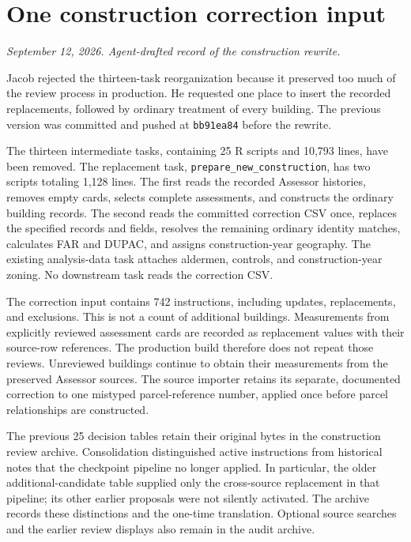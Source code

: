 \section*{One construction correction input}
\textit{September 12, 2026. Agent-drafted record of the construction rewrite.}

Jacob rejected the thirteen-task reorganization because it preserved too much
of the review process in production. He requested one place to insert the
recorded replacements, followed by ordinary treatment of every building. The
previous version was committed and pushed at \texttt{bb91ea84} before the rewrite.

The thirteen intermediate tasks, containing 25 R scripts and 10,793 lines, have
been removed. The replacement task,
\texttt{prepare\_new\_construction}, has two scripts totaling 1,128 lines. The first reads the recorded
Assessor histories, removes empty cards, selects complete assessments, and
constructs the ordinary building records. The second reads the committed
correction CSV once, replaces the specified records and fields, resolves the
remaining ordinary identity matches, calculates FAR and DUPAC, and assigns
construction-year geography. The existing analysis-data task attaches aldermen,
controls, and construction-year zoning. No downstream task reads the correction
CSV.

The correction input contains 742 instructions, including updates, replacements,
and exclusions. This is not a count of additional buildings. Measurements from
explicitly reviewed assessment cards are recorded as replacement values with
their source-row references. The production build therefore does not repeat
those reviews. Unreviewed buildings continue to obtain their measurements from
the preserved Assessor sources. The source importer retains its separate,
documented correction to one mistyped parcel-reference number, applied once
before parcel relationships are constructed.

The previous 25 decision tables retain their original bytes in the construction
review archive. Consolidation distinguished active instructions from historical
notes that the checkpoint pipeline no longer applied. In particular, the older
additional-candidate table supplied only the cross-source replacement in that
pipeline; its other earlier proposals were not silently activated. The archive
records these distinctions and the one-time translation. Optional source searches
and the earlier review displays also remain in the audit archive.

